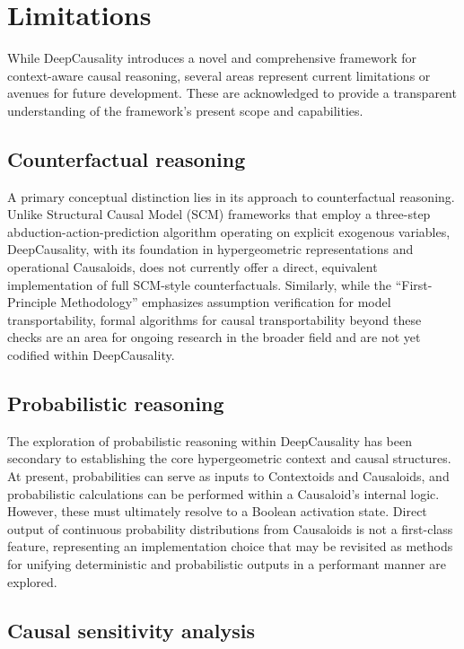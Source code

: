 \section{Limitations}
\label{sec:limitations}

While DeepCausality introduces a novel and comprehensive framework for context-aware causal reasoning, several areas represent current limitations or avenues for future development. These are acknowledged to provide a transparent understanding of the framework's present scope and capabilities.

\subsection{Counterfactual reasoning}

A primary conceptual distinction lies in its approach to counterfactual reasoning. Unlike Structural Causal Model (SCM) frameworks that employ a three-step abduction-action-prediction algorithm operating on explicit exogenous variables, DeepCausality, with its foundation in hypergeometric representations and operational Causaloids, does not currently offer a direct, equivalent implementation of full SCM-style counterfactuals. Similarly, while the ``First-Principle Methodology'' emphasizes assumption verification for model transportability, formal algorithms for causal transportability beyond these checks are an area for ongoing research in the broader field and are not yet codified within DeepCausality.

\subsection{Probabilistic reasoning}

The exploration of probabilistic reasoning within DeepCausality has been secondary to establishing the core hypergeometric context and causal structures. At present, probabilities can serve as inputs to Contextoids and Causaloids, and probabilistic calculations can be performed within a Causaloid's internal logic. However, these must ultimately resolve to a Boolean activation state. Direct output of continuous probability distributions from Causaloids is not a first-class feature, representing an implementation choice that may be revisited as methods for unifying deterministic and probabilistic outputs in a performant manner are explored.

\subsection{Causal sensitivity analysis}

